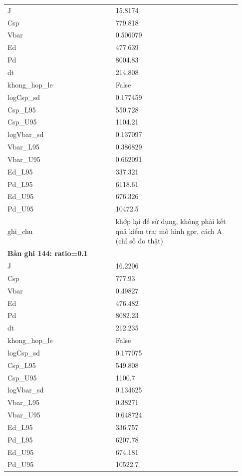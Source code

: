 \begin{longtable}{p{0.43\linewidth}p{0.50\linewidth}}
J & 15.8174 \\
Csp & 779.818 \\
Vbar & 0.506079 \\
Ed & 477.639 \\
Pd & 8004.83 \\
dt & 214.808 \\
khong\_\allowbreak hop\_\allowbreak le & False \\
logCsp\_\allowbreak sd & 0.177459 \\
Csp\_\allowbreak L95 & 550.728 \\
Csp\_\allowbreak U95 & 1104.21 \\
logVbar\_\allowbreak sd & 0.137097 \\
Vbar\_\allowbreak L95 & 0.386829 \\
Vbar\_\allowbreak U95 & 0.662091 \\
Ed\_\allowbreak L95 & 337.321 \\
Pd\_\allowbreak L95 & 6118.61 \\
Ed\_\allowbreak U95 & 676.326 \\
Pd\_\allowbreak U95 & 10472.5 \\
ghi\_\allowbreak chu & khớp lại để sử dụng, không phải kết quả kiểm tra; mô hình gpr, cách A (chỉ số đo thật) \\
\midrule
\multicolumn{2}{p{0.95\linewidth}}{\textbf{Bản ghi 144: ratio=0.1}} \\
J & 16.2206 \\
Csp & 777.93 \\
Vbar & 0.49827 \\
Ed & 476.482 \\
Pd & 8082.23 \\
dt & 212.235 \\
khong\_\allowbreak hop\_\allowbreak le & False \\
logCsp\_\allowbreak sd & 0.177075 \\
Csp\_\allowbreak L95 & 549.808 \\
Csp\_\allowbreak U95 & 1100.7 \\
logVbar\_\allowbreak sd & 0.134625 \\
Vbar\_\allowbreak L95 & 0.38271 \\
Vbar\_\allowbreak U95 & 0.648724 \\
Ed\_\allowbreak L95 & 336.757 \\
Pd\_\allowbreak L95 & 6207.78 \\
Ed\_\allowbreak U95 & 674.181 \\
Pd\_\allowbreak U95 & 10522.7 \\

\end{longtable}
